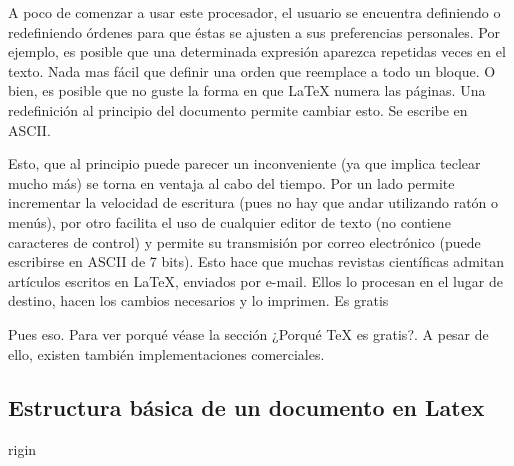 \documentclass[11pt,letterpaper]{article}
\begin{document}
    A poco de comenzar a usar este procesador, el usuario se encuentra definiendo o redefiniendo órdenes para que éstas se ajusten a sus preferencias personales. Por ejemplo, es posible que una determinada expresión aparezca repetidas veces en el texto. Nada mas fácil que definir una orden que reemplace a todo un bloque. O bien, es posible que no guste la forma en que LaTeX numera las páginas. Una redefinición al principio del documento permite cambiar esto.
Se escribe en ASCII.

    Esto, que al principio puede parecer un inconveniente (ya que implica teclear mucho más) se torna en ventaja al cabo del tiempo. Por un lado permite incrementar la velocidad de escritura (pues no hay que andar utilizando ratón o menús), por otro facilita el uso de cualquier editor de texto (no contiene caracteres de control) y permite su transmisión por correo electrónico (puede escribirse en ASCII de 7 bits). Esto hace que muchas revistas científicas admitan artículos escritos en LaTeX, enviados por e-mail. Ellos lo procesan en el lugar de destino, hacen los cambios necesarios y lo imprimen.
Es gratis

    Pues eso. Para ver porqué véase la sección ¿Porqué TeX es gratis?. A pesar de ello, existen también implementaciones comerciales.

\subsection{Estructura básica de un documento en Latex}rigin
\end{document}
